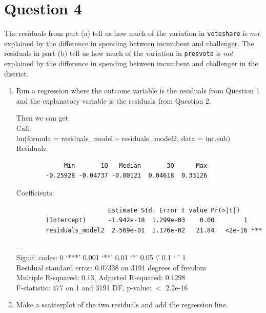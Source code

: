 \documentclass[12pt,letterpaper]{article}
\begin{document}
\section*{Question 4}
\noindent The residuals from part (a) tell us how much of the variation in \texttt{voteshare} is $not$ explained by the difference in spending between incumbent and challenger. The residuals in part (b) tell us how much of the variation in \texttt{presvote} is $not$ explained by the difference in spending between incumbent and challenger in the district.
	\begin{enumerate}
		\item Run a regression where the outcome variable is the residuals from Question 1 and the explanatory variable is the residuals from Question 2.	
		 
		
			Then we can get\\
		
		Call:\\
		lm(formula = residuals\_model \~{} residuals\_model2, data = inc.sub)\\
		
			Residuals:\\
		\begin{verbatim}
		     Min       1Q   Median       3Q      Max 
		-0.25928 -0.04737 -0.00121  0.04618  0.33126 
		\end{verbatim}
		Coefficients:\\
		\begin{verbatim}
		                 Estimate Std. Error t value Pr(>|t|)    
		(Intercept)      -1.942e-18  1.299e-03    0.00        1    
		residuals_model2  2.569e-01  1.176e-02   21.84   <2e-16 ***
		\end{verbatim}
		---\\
		Signif. codes:  0 ‘***’ 0.001 ‘**’ 0.01 ‘*’ 0.05 ‘.’ 0.1 ‘ ’ 1\\
		
		Residual standard error: 0.07338 on 3191 degrees of freedom\\
		Multiple R-squared:   0.13,	Adjusted R-squared:  0.1298 \\
		F-statistic:   477 on 1 and 3191 DF,  p-value: $<$ 2.2e-16
		\vspace{6cm}
		\item Make a scatterplot of the two residuals and add the regression line. 
			\begin{figure}[H]\centering
			

\end{figure}
\end{enumerate}
\end{document}
